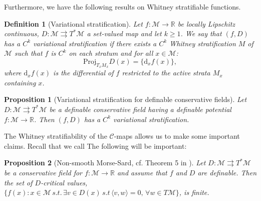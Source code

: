 \documentclass{article}
\newtheorem{definition}{Definition}
\newtheorem{proposition}{Proposition}
\newcommand{\CM}{\mathcal{M}}
\newcommand{\BR}{\mathbb{R}}
\newcommand{\rd}{\mathrm{d}}
\begin{document}
Furthermore, we have the following results on Whitney stratifiable functions. 

\begin{definition}[Variational stratification]
    Let $f: \CM\to\BR$ be locally Lipschitz continuous, $D:\CM\rightrightarrows T^*\CM$ a set-valued map and let $k\geq 1$. We say that $(f,D)$ has a $C^k$ \emph{variational stratification} if there exists a $C^k$ Whitney stratification $M$ of $\CM$ such that $f$ is $C^k$ on each stratum and for all $x\in\CM$:
    \begin{equation}
        \text{Proj}_{T_xM_x}D(x)=\{\rd_xf(x)\},
    \end{equation}
    where $\rd_xf(x)$ is the differential of $f$ restricted to the active strata $M_x$ containing $x$. 
\end{definition}

 \begin{proposition}[Variational stratification for definable conservative fields]\label{th:VarStrat}
     Let $D:\CM\rightrightarrows T^*\CM$ be a definable conservative field having a definable potential $f:\CM\to\BR$. Then $(f,D)$ has a $C^k$ variational stratification. 
\end{proposition}


The Whitney stratifiability of the $\mathcal{C}$-maps allows us to make some important claims. Recall that we call  The following will be important:

\begin{proposition}[Non-smooth Morse-Sard, cf. Theorem 5 in \cite{bolte2021conservative}]\label{th:sard}
    Let $D:\CM\rightrightarrows T^*\CM$ be a conservative field for $f:\CM\to\BR$ and assume that $f$ and $D$ are definable. Then the set of $D$-critical values, $\{f(x):x\in\CM\, s.t.\,\exists v\in D(x) \,s.t\, \langle v,w\rangle=0,\,\forall w\in T\CM\}$, is finite. 
\end{proposition}






\end{document}

